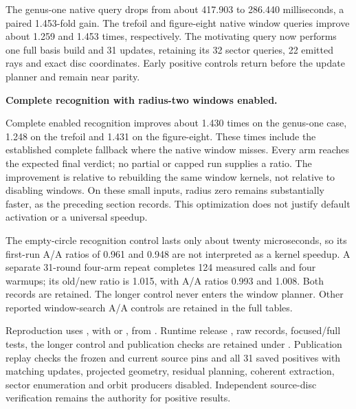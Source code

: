 The genus-one native query drops from about 417.903 to 286.440 milliseconds,
a paired 1.453-fold gain. The trefoil and figure-eight native window queries
improve about 1.259 and 1.453 times, respectively. The motivating query
now performs one full basis build and 31 updates, retaining its 32 sector
queries, 22 emitted rays and exact disc coordinates. Early positive
controls return before the update planner and remain near parity.

\begin{samepage}
\noindent\textbf{Complete recognition with radius-two windows enabled.}

\end{samepage}

Complete enabled recognition improves about 1.430 times on the genus-one
case, 1.248 on the trefoil and 1.431 on the figure-eight. These times include
the established complete fallback where the native window misses. Every
arm reaches the expected final verdict; no partial or capped run supplies
a ratio. The improvement is relative to rebuilding the same window kernels,
not relative to disabling windows. On these small inputs, radius zero
remains substantially faster, as the preceding section records. This
optimization does not justify default activation or a universal speedup.

The empty-circle recognition control lasts only about twenty microseconds,
so its first-run A/A ratios of 0.961 and 0.948 are not interpreted as a
kernel speedup. A separate 31-round four-arm repeat completes 124 measured
calls and four warmups; its old/new ratio is 1.015, with A/A ratios 0.993
and 1.008. Both records are retained. The longer control never enters
the window planner. Other reported window-search A/A controls are retained
in the full tables.

\begin{sloppypar}
Reproduction uses , with
 or , from .
Runtime release , raw records, focused/full tests, the
longer control and publication checks are retained under
. Publication replay checks the frozen and current
source pins and all 31 saved positives with matching updates, projected
geometry, residual planning, coherent extraction, sector enumeration and
orbit producers disabled. Independent source-disc verification remains
the authority for positive results.
\end{sloppypar}
